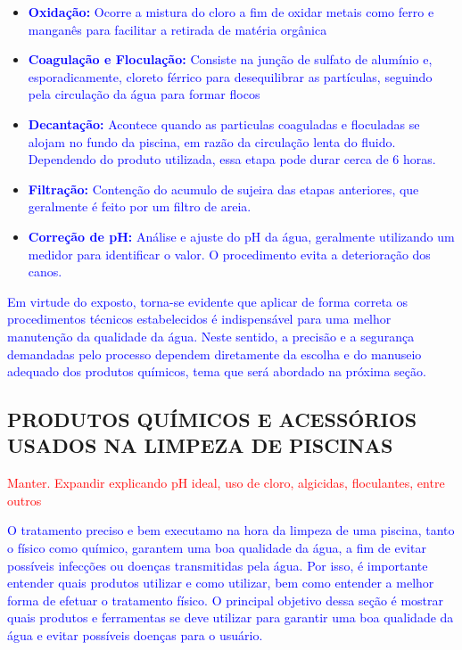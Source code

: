         \begin{itemize}
            \item \textbf{\textcolor{blue}{Oxidação:}} \textcolor{blue}{Ocorre a mistura do cloro a fim de oxidar metais como ferro e manganês para facilitar a retirada de matéria orgânica}
            
            \item \textbf{\textcolor{blue}{Coagulação e Floculação:}} \textcolor{blue}{Consiste na junção de sulfato de alumínio e, esporadicamente, cloreto férrico para desequilibrar as partículas, seguindo pela circulação da água para formar flocos}
             
            \item \textbf{\textcolor{blue}{Decantação:}} \textcolor{blue}{Acontece quando as particulas coaguladas e floculadas se alojam no fundo da piscina, em razão da circulação lenta do fluido. Dependendo do produto utilizada, essa etapa pode durar cerca de 6 horas.}

            \item \textbf{\textcolor{blue}{Filtração:}} \textcolor{blue}{Contenção do acumulo de sujeira das etapas anteriores, que geralmente é feito por um filtro de areia.}

            \item \textbf{\textcolor{blue}{Correção de pH:}} \textcolor{blue}{Análise e ajuste do pH da água, geralmente utilizando um medidor para identificar o valor. O procedimento evita a deterioração dos canos.}
            
        \end{itemize}

        \textcolor{blue}{Em virtude do exposto, torna-se evidente que aplicar de forma correta os procedimentos técnicos estabelecidos é indispensável para uma melhor manutenção da qualidade da água. Neste sentido, a precisão e a segurança demandadas pelo processo dependem diretamente da escolha e do manuseio adequado dos produtos químicos, tema que será abordado na próxima seção.}


    \subsection{PRODUTOS QUÍMICOS E ACESSÓRIOS USADOS NA LIMPEZA DE PISCINAS}
        \textcolor{red}{Manter. Expandir explicando pH ideal, uso de cloro, algicidas, floculantes, entre outros}

        \textcolor{blue}{O tratamento preciso e bem executamo na hora da limpeza de uma piscina, tanto o físico como químico, garantem uma boa qualidade da água, a fim de evitar possíveis infecções ou doenças transmitidas pela água. Por isso, é importante entender quais produtos utilizar e como utilizar, bem como entender a melhor forma de efetuar o tratamento físico. O principal objetivo dessa seção é mostrar quais produtos e ferramentas se deve utilizar para garantir uma boa qualidade da água e evitar possíveis doenças para o usuário.}

